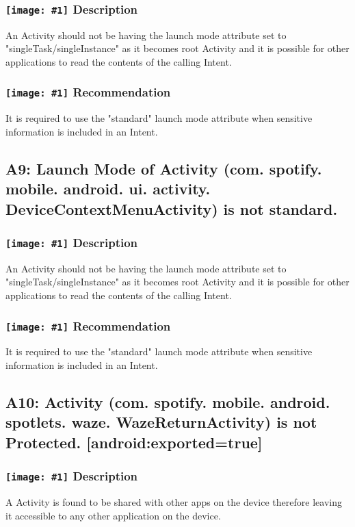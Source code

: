 \documentclass[12p]{article}
\newcommand{\icon}[1]{\texttt{[image: \#1]}}
\begin{document}
\subsubsection*{\protect\icon{/home/miki/Documents/GITHUB/AndroidPermissions/python/vulns/report_icons/basic_sheet.png} Description}
An Activity should not be having the launch mode attribute set to "singleTask/singleInstance" as it becomes root Activity and it is possible for other applications to read the contents of the calling Intent.
\subsubsection*{\protect\icon{/home/miki/Documents/GITHUB/AndroidPermissions/python/vulns/report_icons/basic_todo.png} Recommendation}
It is required to use the "standard" launch mode attribute when sensitive information is included in an Intent.
\subsection{A9: Launch Mode of Activity (com. spotify. mobile. android. ui. activity. DeviceContextMenuActivity) is not standard.}
\subsubsection*{\protect\icon{/home/miki/Documents/GITHUB/AndroidPermissions/python/vulns/report_icons/basic_sheet.png} Description}
An Activity should not be having the launch mode attribute set to "singleTask/singleInstance" as it becomes root Activity and it is possible for other applications to read the contents of the calling Intent.
\subsubsection*{\protect\icon{/home/miki/Documents/GITHUB/AndroidPermissions/python/vulns/report_icons/basic_todo.png} Recommendation}
It is required to use the "standard" launch mode attribute when sensitive information is included in an Intent.
\subsection{A10: Activity (com. spotify. mobile. android. spotlets. waze. WazeReturnActivity) is not Protected. [android:exported=true]}
\subsubsection*{\protect\icon{/home/miki/Documents/GITHUB/AndroidPermissions/python/vulns/report_icons/basic_sheet.png} Description}
A Activity is found to be shared with other apps on the device therefore leaving it accessible to any other application on the device.
\end{document}
